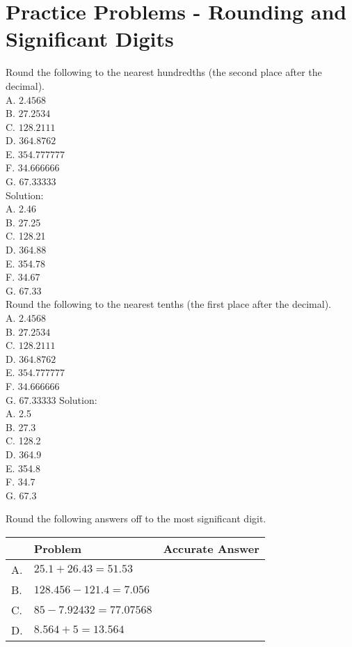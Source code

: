 \section*{Practice Problems - Rounding and Significant Digits}
Round the following to the nearest hundredths (the second place after the decimal).\\
A. $2.4568$\\
B. $27.2534$\\
C. $128.2111$\\
D. $364.8762$\\
E. $354.777777$\\
F. $34.666666$\\
G. $67.33333$\\
\vspace{0.25cm}
Solution:\\
A. 2.46\\
B. 27.25\\
C. 128.21\\
D. 364.88\\
E. 354.78\\
F. 34.67\\
G. 67.33\\
Round the following to the nearest tenths (the first place after the decimal).\\
A. $2.4568$\\
B. $27.2534$\\
C. $128.2111$\\
D. $364.8762$\\
E. $354.777777$\\
F. $34.666666$\\
G. $67.33333$
Solution:\\
A. 2.5\\
B. 27.3\\
C. 128.2\\
D. 364.9\\
E. 354.8\\
F. 34.7\\
G. 67.3

\vspace{0.25cm}

Round the following answers off to the most significant digit.\\

\begin{tabular}{|l|l|l|}
\hline
 & Problem & Accurate Answer \\
\hline
A. & $25.1+26.43=51.53$ &  \\
\hline
B. & $128.456-121.4=7.056$ &  \\
\hline
C. & $85-7.92432=77.07568$ &  \\
\hline
D. & $8.564+5=13.564$ &  \\
\hline
\end{tabular}

